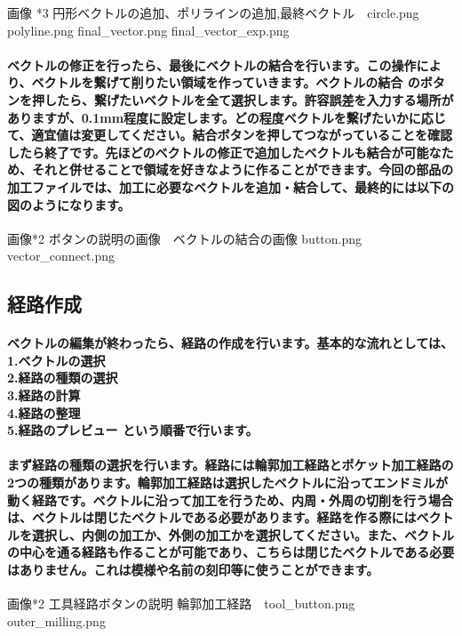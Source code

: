 \documentclass[b5paper, 9pt, twocolumn, titlepage,openany]{jsbook}%
\begin{document}
画像 *3 円形ベクトルの追加、ポリラインの追加,最終ベクトル　circle.png polyline.png final_vector.png final_vector_exp.png

\paragraph{ベクトルの修正を行ったら、最後にベクトルの結合を行います。この操作により、ベクトルを繋げて削りたい領域を作っていきます。ベクトルの結合 のボタンを押したら、繋げたいベクトルを全て選択します。許容誤差を入力する場所がありますが、0.1mm程度に設定します。どの程度ベクトルを繋げたいかに応じて、適宜値は変更してください。結合ボタンを押してつながっていることを確認したら終了です。先ほどのベクトルの修正で追加したベクトルも結合が可能なため、それと併せることで領域を好きなように作ることができます。今回の部品の加工ファイルでは、加工に必要なベクトルを追加・結合して、最終的には以下の図のようになります。}

画像*2 ボタンの説明の画像　ベクトルの結合の画像 button.png vector_connect.png

\subsection{経路作成}
\paragraph{ベクトルの編集が終わったら、経路の作成を行います。基本的な流れとしては、\\
1.ベクトルの選択\\
2.経路の種類の選択\\
3.経路の計算\\
4.経路の整理\\
5.経路のプレビュー
という順番で行います。}

\paragraph{まず経路の種類の選択を行います。経路には輪郭加工経路とポケット加工経路の2つの種類があります。輪郭加工経路は選択したベクトルに沿ってエンドミルが動く経路です。ベクトルに沿って加工を行うため、内周・外周の切削を行う場合は、ベクトルは閉じたベクトルである必要があります。経路を作る際にはベクトルを選択し、内側の加工か、外側の加工かを選択してください。また、ベクトルの中心を通る経路も作ることが可能であり、こちらは閉じたベクトルである必要はありません。これは模様や名前の刻印等に使うことができます。}

画像*2 工具経路ボタンの説明 輪郭加工経路　tool_button.png outer_milling.png
\end{document}
